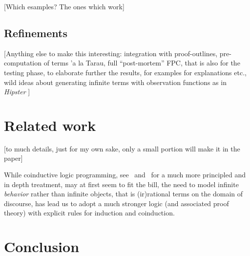 \documentclass[a4paper]{easychair}
\begin{document}
\begin{center}
  [Which esamples? The ones which work]
\end{center}

\subsection{Refinements}
\label{ssec:refs}

\begin{center}
  [Anything else to make this interesting: integration with
  proof-outlines, pre-computation of terms 'a la Tarau, full
  ``post-mortem'' FPC, that is also for the testing phase, to
  elaborate further the results, for examples for explanations etc., wild ideas about generating infinite terms with observation functions as in \emph{Hipster} \cite{EinarsdottirJP18}]
\end{center}

\section{Related work}
\label{sec:rel}

\begin{center}
  [to much details, just for my own sake, only a small portion will make it in the paper]
\end{center}
  While coinductive logic programming,
see~\cite{Luke07} and~\cite{BasoldKL19} for a much more principled and
in depth treatment, may at first seem to fit the bill, the need to
model infinite \emph{behavior} rather than infinite objects, that is (ir)rational terms on the
domain of discourse, has lead us to adopt a much stronger logic (and
associated proof theory) with explicit rules for induction and
coinduction.

\section{Conclusion}
\label{sec:conc}





\end{document}
